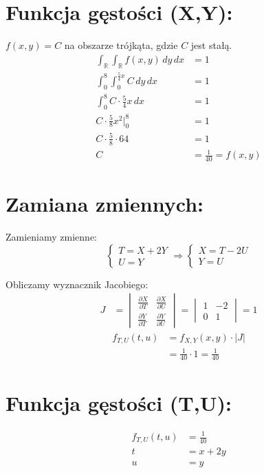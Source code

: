 \documentclass[12pt]{article}
\begin{document}
\vspace{1.5cm}

\section*{Funkcja gęstości (X,Y):}

$f(x,y) = C$ na obszarze trójkąta, gdzie $C$ jest stałą. \\

\begin{align*}
    \int_\mathbb{R}  \int_\mathbb{R}  f(x, y) \, dy \, dx &= 1 \\
    \int_0^8 \int_0^{\frac{5}{4}x} C \, dy \, dx &= 1 \\
    \int_0^8 C \cdot \frac{5}{4}x \, dx &= 1 \\
    C \cdot \frac{5}{8}x^2 \bigg|_0^8 &= 1 \\
    C \cdot \frac{5}{8} \cdot 64 &= 1 \\
    C &= \frac{1}{40} = f(x,y)
\end{align*}

\section*{Zamiana zmiennych:}
Zamieniamy zmienne: \\
\begin{equation*}
    \begin{cases}
        T = X + 2Y \\
        U = Y
    \end{cases}
    \Rightarrow 
    \begin{cases}
        X = T - 2U \\
        Y = U
    \end{cases}
\end{equation*}

Obliczamy wyznacznik Jacobiego: \\
\begin{align*}
    J &= \begin{vmatrix}
        \frac{\partial X}{\partial T} & \frac{\partial X}{\partial U} \\
        \frac{\partial Y}{\partial T} & \frac{\partial Y}{\partial U}
    \end{vmatrix} = 
    \begin{vmatrix}
        1 & -2 \\
        0 & 1
    \end{vmatrix} = 1
\end{align*}
\begin{align*}
    f_{T,U}(t,u) &= f_{X,Y}(x,y) \cdot |J| \\
    &= \frac{1}{40} \cdot 1 = \frac{1}{40}
\end{align*}

\section*{Funkcja gęstości (T,U):}

\begin{align*}
    f_{T,U}(t,u) &= \frac{1}{40} \\
    t &= x + 2y \\
    u &= y
\end{align*}
\end{document}
